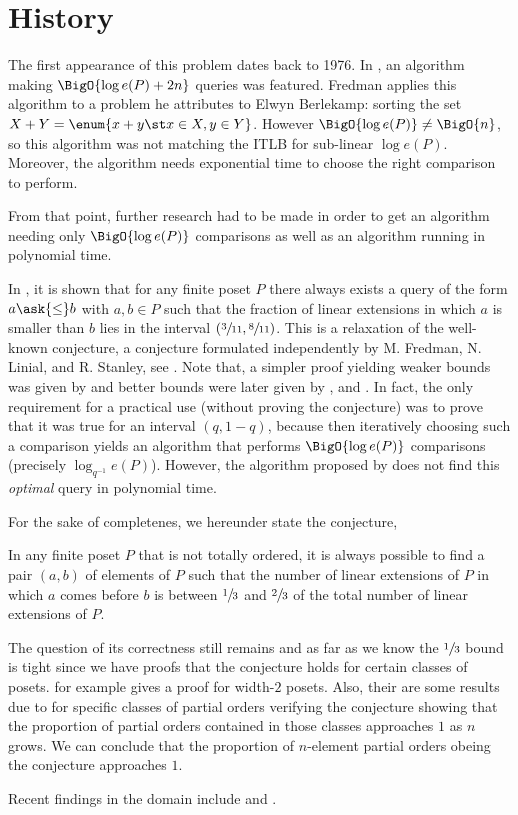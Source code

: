 \section{History}

The first appearance of this problem dates back to 1976. In
\citet*{fredman:1976}, an algorithm making $\BigO{\log e(P) + 2n}$ queries was
featured. Fredman applies this algorithm to a problem he attributes to Elwyn
Berlekamp: sorting the set $X + Y = \enum{x + y \st x \in X, y \in Y}$. However
$\BigO{\log e(P)} \neq \BigO{n}$, so this algorithm was not matching the ITLB
for sub-linear $\log e(P)$. Moreover, the algorithm needs exponential time to
choose the right comparison to perform.

From that point, further research had to be made in order to get an algorithm
needing only $\BigO{\log e(P)}$ comparisons as well as an algorithm running in
polynomial time.

In \citet*{kahn1984balancing}, it is shown that for any finite poset \(P\)
there always exists a query of the form \(a \ask{\leq} b\) with \(a,b \in P\)
such that the fraction of linear extensions in which $a$ is smaller than $b$
lies in the interval $(\sfrac{3}{11}, \sfrac{8}{11})$. This is a relaxation of
the well-known \onethirdtwothird conjecture, a conjecture formulated
independently by M. Fredman, N. Linial, and R. Stanley, see
\citet*{linial:1984}. Note that, a simpler proof yielding weaker
bounds was given by \citet*{kahn1991balancing} and better bounds were later
given by \citet*{brightwell1995balancing}, and \citet*{brightwell1999balanced}.
In fact, the only requirement for a practical use (without proving the
conjecture) was to prove that it was true for an interval $(q, 1-q)$, because
then iteratively choosing such a comparison yields an algorithm that performs
$\BigO{\log e(P)}$ comparisons (precisely $\log_{q^{-1}} e(P)$). However, the
algorithm proposed by \citet*{kahn1984balancing} does not find this
\emph{optimal} query in polynomial time.

For the sake of completenes, we hereunder state the \onethirdtwothird
conjecture,

\begin{conjecture}
In any finite poset $P$ that is not totally ordered, it is always possible to
find a pair $(a,b)$ of elements of $P$ such that the number of linear
extensions of $P$ in which $a$ comes before $b$ is between $\sfrac{1}{3}$ and
$\sfrac{2}{3}$ of the total number of linear extensions of $P$.
\end{conjecture}

The question of its correctness still remains and as far as we know the
$\sfrac{1}{3}$ bound is tight since we have proofs that the conjecture holds
for certain classes of posets. \citet*{linial:1984} for example gives a proof
for width-\(2\) posets. Also, their are some results due to
\citet*{peczarski:2006} for specific classes of partial orders verifying the
conjecture showing that the proportion of partial orders contained in those
classes approaches $1$ as $n$ grows. We can conclude that the proportion of
$n$-element partial orders obeing the \onethirdtwothird conjecture approaches
$1$.

Recent findings in the domain include \citet*{zaguia:2011} and
\citet*{peczarski:2008}.

